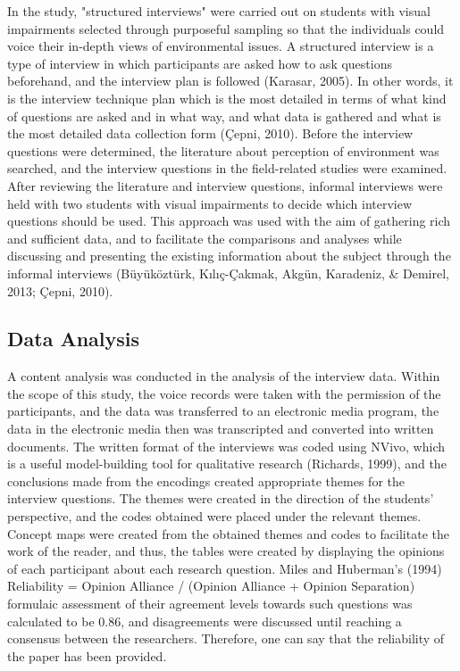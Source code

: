 \documentclass[11.5pt]{sig-alternate} %
\begin{document}
\begin{large}
In the study, "structured interviews" were carried out on students with visual impairments selected through purposeful sampling so that the individuals could voice their in-depth views of environmental issues. A structured interview is a type of interview in which participants are asked how to ask questions beforehand, and the interview plan is followed (Karasar, 2005). In other words, it is the interview technique plan which is the most detailed in terms of what kind of questions are asked and in what way, and what data is gathered and what is the most detailed data collection form (Çepni, 2010). Before the interview questions were determined, the literature about perception of environment was searched, and the interview questions in the field-related studies were examined. After reviewing the literature and interview questions, informal interviews were held with two students with visual impairments to decide which interview questions should be used. This approach was used with the aim of gathering rich and sufficient data, and to facilitate the comparisons and analyses while discussing and presenting the existing information about the subject through the informal interviews (Büyüköztürk, Kılıç-Çakmak, Akgün, Karadeniz, \& Demirel, 2013; Çepni, 2010). 

\subsection*{Data Analysis}

A content analysis was conducted in the analysis of the interview data. Within the scope of this study, the voice records were taken with the permission of the participants, and the data was transferred to an electronic media program, the data in the electronic media then was transcripted and converted into written documents. The written format of the interviews was coded using NVivo, which is a useful model-building tool for qualitative research (Richards, 1999), and the conclusions made from the encodings created appropriate themes for the interview questions. The themes were created in the direction of the students’ perspective, and the codes obtained were placed under the relevant themes. Concept maps were created from the obtained themes and codes to facilitate the work of the reader, and thus, the tables were created by displaying the opinions of each participant about each research question. Miles and Huberman's (1994) Reliability = Opinion Alliance / (Opinion Alliance + Opinion Separation) formulaic assessment of their agreement levels towards such questions was calculated to be 0.86, and disagreements were discussed until reaching a consensus between the researchers. Therefore, one can say that the reliability of the paper has been provided.


\end{large}
\end{document}
